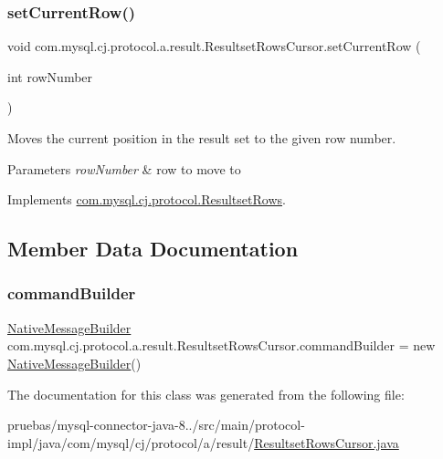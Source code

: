 \subsubsection{\texorpdfstring{set\+Current\+Row()}{setCurrentRow()}}
{\footnotesize\ttfamily void com.\+mysql.\+cj.\+protocol.\+a.\+result.\+Resultset\+Rows\+Cursor.\+set\+Current\+Row (\begin{DoxyParamCaption}\item[{int}]{row\+Number }\end{DoxyParamCaption})}

Moves the current position in the result set to the given row number.


\begin{DoxyParams}{Parameters}
{\em row\+Number} & row to move to \\
\hline
\end{DoxyParams}


Implements \mbox{\hyperlink{interfacecom_1_1mysql_1_1cj_1_1protocol_1_1_resultset_rows_a813efe790e18424a02b692a3f9213446}{com.\+mysql.\+cj.\+protocol.\+Resultset\+Rows}}.



\subsection{Member Data Documentation}
\mbox{\label{classcom_1_1mysql_1_1cj_1_1protocol_1_1a_1_1result_1_1_resultset_rows_cursor_a2873f0677be47b53bf5adec00d6719cc}} 
\subsubsection{\texorpdfstring{command\+Builder}{commandBuilder}}
{\footnotesize\ttfamily \mbox{\hyperlink{classcom_1_1mysql_1_1cj_1_1protocol_1_1a_1_1_native_message_builder}{Native\+Message\+Builder}} com.\+mysql.\+cj.\+protocol.\+a.\+result.\+Resultset\+Rows\+Cursor.\+command\+Builder = new \mbox{\hyperlink{classcom_1_1mysql_1_1cj_1_1protocol_1_1a_1_1_native_message_builder}{Native\+Message\+Builder}}()\hspace{0.3cm}{\ttfamily [protected]}}



The documentation for this class was generated from the following file\+:\begin{DoxyCompactItemize}
\item 
pruebas/mysql-\/connector-\/java-\/8../src/main/protocol-\/impl/java/com/mysql/cj/protocol/a/result/\mbox{\hyperlink{_resultset_rows_cursor_8java}{Resultset\+Rows\+Cursor.\+java}}\end{DoxyCompactItemize}
